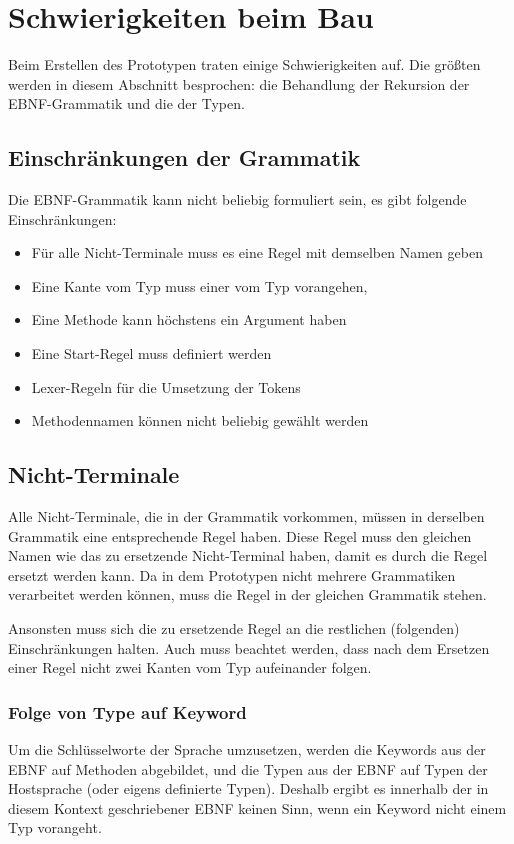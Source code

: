 \documentclass[../InterneDSLs.tex]{subfiles}
\begin{document}
\section{Schwierigkeiten beim Bau}
Beim Erstellen des Prototypen traten einige Schwierigkeiten auf. Die größten werden in diesem Abschnitt besprochen: die Behandlung der Rekursion der EBNF-Grammatik und die der Typen.

\subsection{Einschränkungen der Grammatik}
Die EBNF-Grammatik kann nicht beliebig formuliert sein, es gibt folgende Einschränkungen:
\begin{itemize}
	\item Für alle Nicht-Terminale muss es eine Regel mit demselben Namen geben
	\item Eine Kante vom Typ  muss einer vom Typ  vorangehen,
	\item Eine Methode kann höchstens ein Argument haben
	\item Eine Start-Regel muss definiert werden
	\item Lexer-Regeln für die Umsetzung der Tokens
	\item Methodennamen können nicht beliebig gewählt werden
\end{itemize}

\subsection{Nicht-Terminale}
Alle Nicht-Terminale, die in der Grammatik vorkommen, müssen in derselben Grammatik eine entsprechende Regel haben. Diese Regel muss den gleichen Namen wie das zu ersetzende Nicht-Terminal haben, damit es durch die Regel ersetzt werden kann. Da in dem Prototypen nicht mehrere Grammatiken verarbeitet werden können, muss die Regel in der gleichen Grammatik stehen.

Ansonsten muss sich die zu ersetzende Regel an die restlichen (folgenden) Einschränkungen halten. Auch muss beachtet werden, dass nach dem Ersetzen einer Regel nicht zwei Kanten vom Typ  aufeinander folgen.

\subsubsection{Folge von Type auf Keyword}\label{SEC:TypeFollowsKeyword}
Um die Schlüsselworte der Sprache umzusetzen, werden die Keywords aus der EBNF auf Methoden abgebildet, und die Typen aus der EBNF auf Typen der Hostsprache (oder eigens definierte Typen). Deshalb ergibt es innerhalb der in diesem Kontext geschriebener EBNF keinen Sinn, wenn ein Keyword nicht einem Typ vorangeht.
\end{document}
